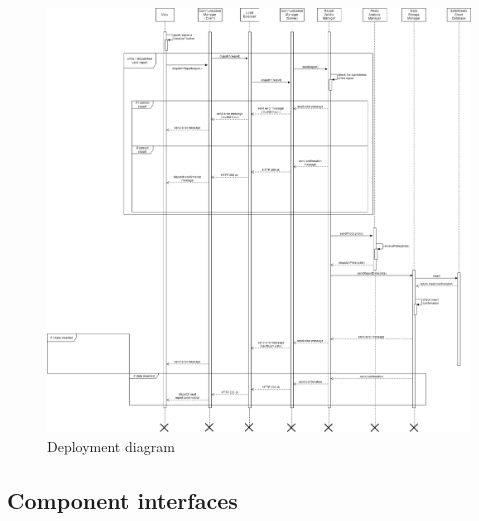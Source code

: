 \documentclass[titlepage]{article}
\begin{document}
\begin{figure}[h]
	\includegraphics[scale=0.298]{Diagrams/Sequence Diagrams/Runtime View Diagram report.png}
	\caption{Deployment diagram}
\end{figure}
\FloatBarrier

\subsection{Component interfaces}
\end{document}
